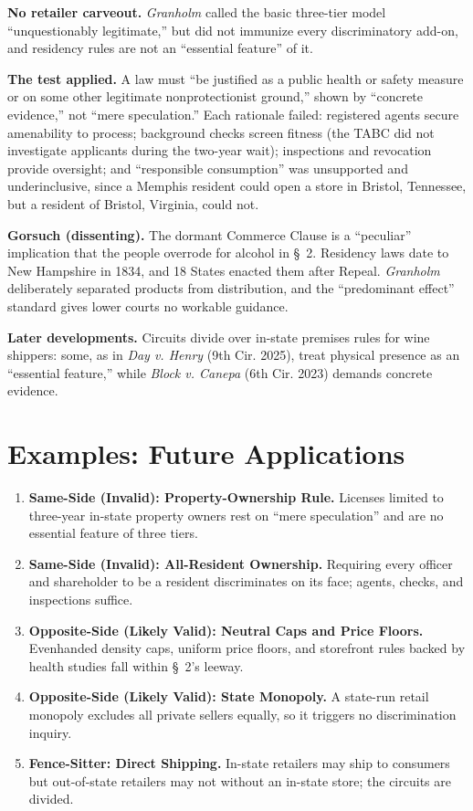 \documentclass[12pt]{article}
\begin{document}
\textbf{No retailer carveout.} \textit{Granholm} called the basic three-tier model ``unquestionably legitimate,'' but did not immunize every discriminatory add-on, and residency rules are not an ``essential feature'' of it.

\textbf{The test applied.} A law must ``be justified as a public health or safety measure or on some other legitimate nonprotectionist ground,'' shown by ``concrete evidence,'' not ``mere speculation.'' Each rationale failed: registered agents secure amenability to process; background checks screen fitness (the TABC did not investigate applicants during the two-year wait); inspections and revocation provide oversight; and ``responsible consumption'' was unsupported and underinclusive, since a Memphis resident could open a store in Bristol, Tennessee, but a resident of Bristol, Virginia, could not.

\textbf{Gorsuch (dissenting).} The dormant Commerce Clause is a ``peculiar'' implication that the people overrode for alcohol in \S~2. Residency laws date to New Hampshire in 1834, and 18 States enacted them after Repeal. \textit{Granholm} deliberately separated products from distribution, and the ``predominant effect'' standard gives lower courts no workable guidance.

\textbf{Later developments.} Circuits divide over in-state premises rules for wine shippers: some, as in \textit{Day v. Henry} (9th Cir. 2025), treat physical presence as an ``essential feature,'' while \textit{Block v. Canepa} (6th Cir. 2023) demands concrete evidence.

\section{Examples: Future Applications}

\begin{enumerate}
\item \textbf{Same-Side (Invalid): Property-Ownership Rule.} Licenses limited to three-year in-state property owners rest on ``mere speculation'' and are no essential feature of three tiers.
\item \textbf{Same-Side (Invalid): All-Resident Ownership.} Requiring every officer and shareholder to be a resident discriminates on its face; agents, checks, and inspections suffice.
\item \textbf{Opposite-Side (Likely Valid): Neutral Caps and Price Floors.} Evenhanded density caps, uniform price floors, and storefront rules backed by health studies fall within \S~2's leeway.
\item \textbf{Opposite-Side (Likely Valid): State Monopoly.} A state-run retail monopoly excludes all private sellers equally, so it triggers no discrimination inquiry.
\item \textbf{Fence-Sitter: Direct Shipping.} In-state retailers may ship to consumers but out-of-state retailers may not without an in-state store; the circuits are divided.
\end{enumerate}
\end{document}
